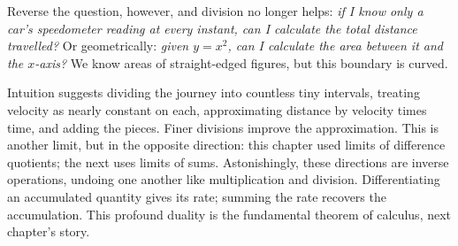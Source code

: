 Reverse the question, however, and division no longer helps: \emph{if I know only a car's speedometer reading at every instant, can I calculate the total distance travelled?} Or geometrically: \emph{given $y=x^2$, can I calculate the area between it and the $x$-axis?} We know areas of straight-edged figures, but this boundary is curved.

Intuition suggests dividing the journey into countless tiny intervals, treating velocity as nearly constant on each, approximating distance by velocity times time, and adding the pieces. Finer divisions improve the approximation. This is another limit, but in the opposite direction: this chapter used limits of difference quotients; the next uses limits of sums. Astonishingly, these directions are inverse operations, undoing one another like multiplication and division. Differentiating an accumulated quantity gives its rate; summing the rate recovers the accumulation. This profound duality is the fundamental theorem of calculus, next chapter's story.
